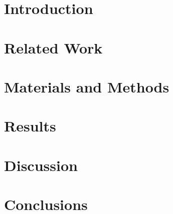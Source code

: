 \documentclass[applsci,article,submit,pdftex,moreauthors]{Definitions/mdpi}
\begin{document}
\section{Introduction}
\label{sec:introduction}


\section{Related Work}
\label{sec:related}


\section{Materials and Methods}
\label{sec:methods}


\section{Results}
\label{sec:results}


\section{Discussion}
\label{sec:discussion}


\section{Conclusions}
\label{sec:conclusions}


\appendixstart
\appendix





\end{document}
